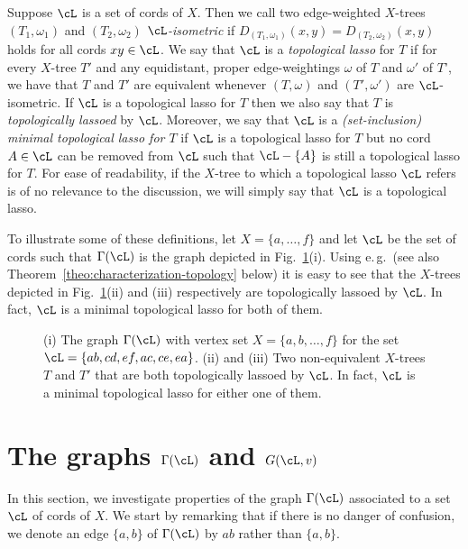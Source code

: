 Suppose $\cL$ is a set of cords of $X$. Then we call two edge-weighted
$X$-trees $(T_1,\omega_1)$ and $(T_2,\omega_2)$ {\em $\cL$-isometric} if
$D_{(T_1,\omega_1)}(x,y)=D_{(T_2,\omega_2)}(x,y)$ holds for all cords $xy\in
\cL$. We say that $\cL$ is a {\em topological lasso} for $T$ if for every
$X$-tree $T'$ and any equidistant, proper edge-weightings $\omega$ of $T$ and
$\omega'$ of $T$', we have that $T$ and $T'$ are equivalent whenever
$(T,\omega)$ and $(T',\omega')$ are $\cL$-isometric.  If $\cL$ is a
topological lasso for $T$ then we also say that $T$ is {\em topologically
  lassoed} by $\cL$. Moreover, we say that $\cL$ is a {\em (set-inclusion)
  minimal topological lasso for $T$} if $\cL$ is a topological lasso for $T$
but no cord $A\in \cL$ can be removed from $\cL$ such that $\cL-\{A\}$ is
still a topological lasso for $T$.  For ease of readability, if the $X$-tree
to which a topological lasso $\cL$ refers is of no relevance to the
discussion, we will simply say that $\cL$ is a topological lasso.

To illustrate some of these definitions, let $X=\{a,\ldots, f\}$ and let $\cL$
be the set of cords such that $\Gamma(\cL)$ is the graph depicted in
Fig.~\ref{fig:block-graph-motivation}(i).  Using
e.\,g.\,\cite[Theorem~7.1]{HP13} (see also
Theorem~\ref{theo:characterization-topology} below) it is easy to see that the
$X$-trees depicted in Fig.~\ref{fig:block-graph-motivation}(ii) and (iii)
respectively are topologically lassoed by $\cL$. In fact, $\cL$ is a minimal
topological lasso for both of them.
\begin{figure}[h]
\begin{center}

\end{center}
\caption{\label{fig:block-graph-motivation}
(i) The graph $\Gamma(\cL)$ with vertex set $X=\{a,b,\ldots,f\}$
for the set $\cL=\{ab,cd,ef,ac,ce,ea\}$. (ii) and (iii)
Two non-equivalent $X$-trees $T$ and $T'$
that are both topologically lassoed by $\cL$. In fact, 
$\cL$ is a minimal topological lasso for either one of them.
}
\end{figure}


\section{The graphs $\Gamma(\cL)$ and 
$G(\cL,v)$}\label{sec:gamma-l-graph}


In this section, we investigate properties of the graph $\Gamma(\cL)$
associated to a %
set $\cL$ of cords of $X$. We start by remarking that if there is no danger of
confusion, we denote an edge $\{a,b\}$ of $\Gamma(\cL)$ by $ab$ rather than
$\{a,b\}$.

